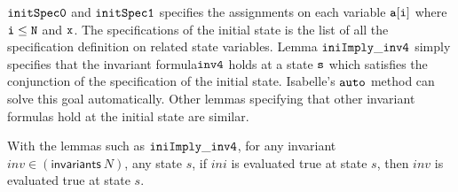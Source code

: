 ${\tt initSpec0}$ and ${\tt initSpec1}$ specifies the assignments
on each variable ${\tt a[i]}$ where ${\tt i \le N}$ and ${\tt x}$.
The specifications of the initial state is the list of all the specification definition on related state variables.
Lemma ${\tt iniImply\_inv4}$ simply specifies that the invariant formula$ {\tt inv4}$
holds at a state ${\tt s}$ which satisfies the conjunction of the specification of the initial state.
Isabelle's ${\tt auto}$ method can solve this goal automatically.
Other lemmas specifying that other invariant formulas hold at the initial state are similar.

With the lemmas such as ${\tt iniImply\_inv4}$,
for any invariant $inv \in (\mathsf{invariants} ~N) $,  any
state $s$, if $ini$ is evaluated true at state $s$, then $inv$ is
evaluated true at state $s$.\\

